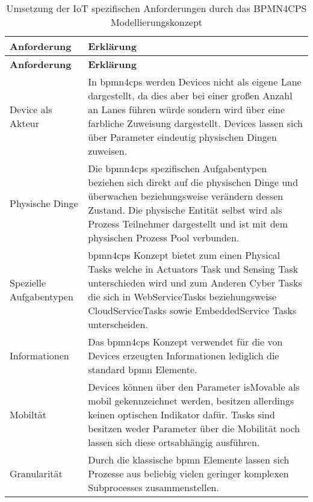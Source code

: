  \begin{longtable}{P{4cm}|X}
  \caption{Umsetzung der IoT spezifischen Anforderungen durch das BPMN4CPS Modellierungskonzept}\\
  \label{table:evaluierungskriterien}
  \textbf{Anforderung} & \textbf{Erklärung}   \\ \hline
  \endfirsthead %
  \textbf{Anforderung} & \textbf{Erklärung}  \\ \hline
  \endhead %
  Device als Akteur & In \ac{bpmn4cps} werden Devices nicht als eigene Lane dargestellt, da dies aber bei einer großen Anzahl an Lanes führen würde sondern wird über eine farbliche Zuweisung dargestellt. Devices lassen sich über Parameter eindeutig physischen Dingen zuweisen. \\ \hline
  Physische Dinge  & Die \ac{bpmn4cps} spezifischen Aufgabentypen beziehen sich direkt auf die physischen Dinge und überwachen beziehungsweise verändern dessen Zustand. Die physische Entität selbst wird als Prozess Teilnehmer dargestellt und ist mit dem physischen Prozess Pool verbunden.\\ \hline
  Spezielle Aufgabentypen & \ac{bpmn4cps} Konzept bietet zum einen Physical Tasks welche in Actuators Task und Sensing Task unterschieden wird und zum Anderen Cyber Tasks die sich in WebServiceTasks beziehungsweise CloudServiceTasks sowie EmbeddedService Tasks unterscheiden.\\ \hline
  Informationen  & Das \ac{bpmn4cps} Konzept verwendet für die von Devices erzeugten Informationen lediglich die standard \ac{bpmn} Elemente.\\ \hline
  Mobiltät & Devices können über den Parameter isMovable als mobil gekennzeichnet werden, besitzen allerdings keinen optischen Indikator dafür. Tasks sind besitzen weder Parameter über die Mobilität noch lassen sich diese ortsabhängig ausführen.\\ \hline
  Granularität & Durch die klassische \ac{bpmn} Elemente lassen sich Prozesse aus beliebig vielen geringer komplexen Subprocesses zusammenstellen.\\
 \end{longtable}
